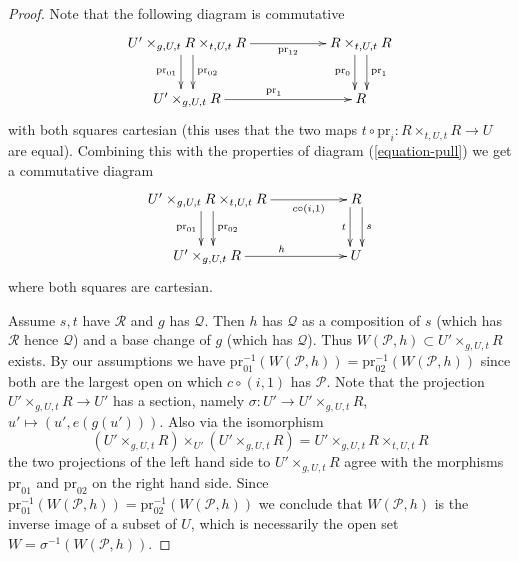 \documentclass{stacks-project}
\theoremstyle{plain}
\theoremstyle{definition}
\theoremstyle{remark}
\numberwithin{equation}{subsection}
\begin{document}
\begin{proof}
Note that the following diagram is commutative
$$
\xymatrix{
U' \times_{g, U, t} R \times_{t, U, t} R
\ar[rr]_-{\text{pr}_{12}}
\ar@<1ex>[d]^-{\text{pr}_{02}} \ar@<-1ex>[d]_-{\text{pr}_{01}} & &
R \times_{t, U, t} R
\ar@<1ex>[d]^-{\text{pr}_1} \ar@<-1ex>[d]_-{\text{pr}_0}
\\
U' \times_{g, U, t} R \ar[rr]^{\text{pr}_1} & & R
}
$$
with both squares cartesian (this uses that the two maps
$t \circ \text{pr}_i : R \times_{t, U, t} R \to U$ are equal).
Combining this with the properties of diagram (\ref{equation-pull})
we get a commutative diagram
$$
\xymatrix{
U' \times_{g, U, t} R \times_{t, U, t} R
\ar[rr]_-{c \circ (i, 1)}
\ar@<1ex>[d]^-{\text{pr}_{02}} \ar@<-1ex>[d]_-{\text{pr}_{01}} & &
R
\ar@<1ex>[d]^-{s} \ar@<-1ex>[d]_-{t}
\\
U' \times_{g, U, t} R \ar[rr]^h & & U
}
$$
where both squares are cartesian.

\medskip\noindent
Assume $s, t$ have $\mathcal{R}$ and $g$ has $\mathcal{Q}$.
Then $h$ has $\mathcal{Q}$ as a composition of $s$ (which has
$\mathcal{R}$ hence $\mathcal{Q}$) and a base change of $g$ (which
has $\mathcal{Q}$). Thus $W(\mathcal{P}, h) \subset U' \times_{g, U, t} R$
exists. By our assumptions we have
$\text{pr}_{01}^{-1}(W(\mathcal{P}, h)) =
\text{pr}_{02}^{-1}(W(\mathcal{P}, h))$
since both are the largest open on which $c \circ (i, 1)$ has $\mathcal{P}$.
Note that the projection $U' \times_{g, U, t} R \to U'$ has a section, namely
$\sigma : U' \to U' \times_{g, U, t} R$, $u' \mapsto (u', e(g(u')))$.
Also via the isomorphism
$$
(U' \times_{g, U, t} R) \times_{U'} (U' \times_{g, U, t} R)
=
U' \times_{g, U, t} R \times_{t, U, t} R
$$
the two projections of the left hand side
to $U' \times_{g, U, t} R$ agree with the morphisms $\text{pr}_{01}$
and $\text{pr}_{02}$ on the right hand side. Since
$\text{pr}_{01}^{-1}(W(\mathcal{P}, h)) =
\text{pr}_{02}^{-1}(W(\mathcal{P}, h))$
we conclude that $W(\mathcal{P}, h)$ is the inverse image of a subset of $U$,
which is necessarily the open set
$W = \sigma^{-1}(W(\mathcal{P}, h))$.
\end{proof}
\end{document}
